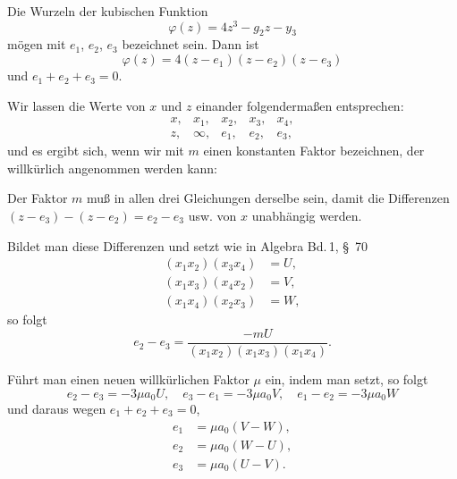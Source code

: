 
Die Wurzeln der kubischen Funktion
\[
\varphi(z) = 4z^3 - g_2 z - y_3 %
\]
mögen mit $e_1$, $e_2$, $e_3$ bezeichnet sein. Dann ist
\[
\varphi(z) = 4(z-e_1)(z-e_2)(z-e_3)
\]
und $e_1 + e_2 + e_3 = 0$.

Wir lassen die Werte von $x$ und $z$ einander folgendermaßen entsprechen:
\[
\begin{array}{ccccc}
x, & x_1, & x_2, & x_3, & x_4, \\
z, & \infty, & e_1, & e_2, & e_3,
\end{array}
\]
und es ergibt sich, wenn wir mit $m$ einen konstanten Faktor bezeichnen, der willkürlich angenommen werden kann:

Der Faktor $m$ muß in allen drei Gleichungen derselbe sein, damit die Differenzen $(z-e_3)-(z-e_2)=e_2-e_3$ usw. von $x$ unabhängig werden.

Bildet man diese Differenzen und setzt wie in Algebra Bd.\,1, \S\ 70
\[
\begin{aligned}
(x_1x_2)(x_3x_4) &= U,\\
(x_1x_3)(x_4x_2) &= V,\\
(x_1x_4)(x_2x_3) &= W,
\end{aligned}
\]
so folgt
\[
e_2 - e_3 = \frac{-mU}{(x_1x_2)(x_1x_3)(x_1x_4)}.
\]

Führt man einen neuen willkürlichen Faktor $\mu$ ein, indem man
setzt, so folgt
\[
e_2 - e_3 = -3\mu a_0 U, \quad e_3 - e_1 = -3\mu a_0 V, \quad e_1 - e_2 = -3\mu a_0 W
\]
und daraus wegen $e_1+e_2+e_3=0$,
\[
\begin{aligned}
e_1 &= \mu a_0 (V-W),\\
e_2 &= \mu a_0 (W-U),\\
e_3 &= \mu a_0 (U-V).
\end{aligned}
\]
